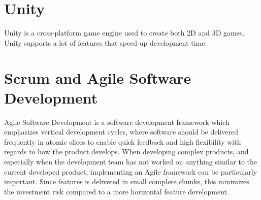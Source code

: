 

\section{Unity}
    Unity is a cross-platform game engine used to create both 2D and 3D games. Unity supports a lot of features that speed up development time. 







\section{Scrum and Agile Software Development}
    Agile Software Development is a software development framework which emphasizes vertical development cycles, where software should be delivered frequently in atomic slices to enable quick feedback and high flexibility with regards to how the product develops. When developing complex products, and especially when the development team has not worked on anything similar to the current developed product, implementing an Agile framework can be particularly important. Since features is delivered in small complete chunks, this minimizes the investment risk compared to a more horizontal feature development. 






